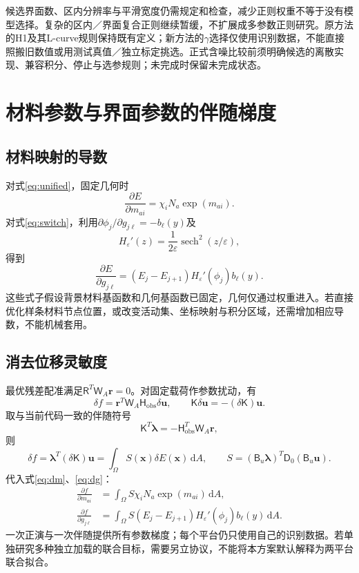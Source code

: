 \documentclass[11pt,a4paper]{ctexart}
\newcommand{\dd}{\,\mathrm d}
\newcommand{\obs}{\mathsf H_{\mathrm{obs}}}
\newcommand{\wa}{\mathsf W_A}
\begin{document}
候选界面数、区内分辨率与平滑宽度仍需规定和检查，减少正则权重不等于没有模型选择。复杂的区内／界面复合正则继续暂缓，不扩展成多参数正则研究。原方法的H1及其L-curve规则保持既有定义；新方法的$\gamma$选择仅使用识别数据，不能直接照搬旧数值或用测试真值／独立标定挑选。正式含噪比较前须明确候选的离散实现、兼容积分、停止与选参规则；未完成时保留未完成状态。

\section{材料参数与界面参数的伴随梯度}
\subsection{材料映射的导数}
对式\eqref{eq:unified}，固定几何时
\begin{equation}
 \boxed{\frac{\partial E}{\partial m_{ai}}=\chi_iN_a\exp(m_{ai}).}
 \label{eq:dm}
\end{equation}
对式\eqref{eq:switch}，利用$\partial\phi_j/\partial g_{j\ell}=-b_\ell(y)$及
\begin{equation}
 H_\varepsilon'(z)=\frac{1}{2\varepsilon}\operatorname{sech}^2(z/\varepsilon),
\end{equation}
得到
\begin{equation}
 \boxed{\frac{\partial E}{\partial g_{j\ell}}
 =(E_j-E_{j+1})H_\varepsilon'(\phi_j)b_\ell(y).}
 \label{eq:dg}
\end{equation}
这些式子假设背景材料基函数和几何基函数已固定，几何仅通过权重进入。若直接优化样条材料节点位置，或改变活动集、坐标映射与积分区域，还需增加相应导数，不能机械套用。

\subsection{消去位移灵敏度}
最优残差配准满足$\mathsf R^T\wa\mathbf r=0$。对固定载荷作参数扰动，有
\begin{equation}
 \delta f=\mathbf r^T\wa\obs\delta\mathbf u,
 \qquad \mathsf K\delta\mathbf u=-(\delta\mathsf K)\mathbf u.
\end{equation}
取与当前代码一致的伴随符号
\begin{equation}
 \mathsf K^T\boldsymbol\lambda=-\obs^T\wa\mathbf r,
\end{equation}
则
\begin{equation}
 \delta f=\boldsymbol\lambda^T(\delta\mathsf K)\mathbf u
         =\int_\Omega S(\mathbf x)\delta E(\mathbf x)\dd A,
 \qquad S=(\mathsf B_u\boldsymbol\lambda)^T\mathsf D_0(\mathsf B_u\mathbf u).
 \label{eq:adjoint}
\end{equation}
代入式\eqref{eq:dm}、\eqref{eq:dg}：
\begin{align}
 \frac{\partial f}{\partial m_{ai}}
 &=\int_\Omega S\chi_iN_a\exp(m_{ai})\dd A, \label{eq:gradm}\\
 \frac{\partial f}{\partial g_{j\ell}}
 &=\int_\Omega S(E_j-E_{j+1})H_\varepsilon'(\phi_j)b_\ell(y)\dd A.
 \label{eq:gradg}
\end{align}
一次正演与一次伴随提供所有参数梯度；每个平台仍只使用自己的识别数据。若单独研究多种独立加载的联合目标，需要另立协议，不能将本方案默认解释为两平台联合拟合。
\end{document}
